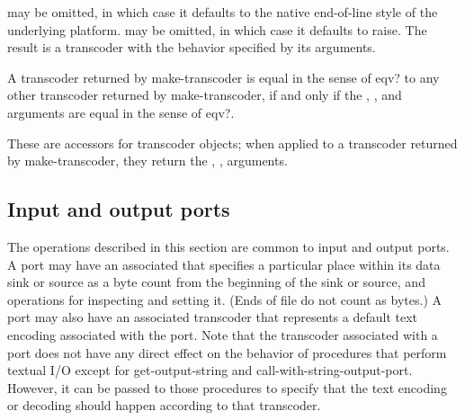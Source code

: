 \begin{entry}{%
}

   may be omitted, in
which case it defaults to the native end-of-line style of the
underlying platform.   may be omitted, in which
case it defaults to {\cf raise}.  The result is a transcoder with the
behavior specified by its arguments.

A transcoder returned by {\cf make-transcoder} is equal in the sense
of {\cf eqv?} to any other transcoder returned by {\cf
  make-transcoder}, if and only if the , ,
and  arguments are equal in the sense of {\cf
  eqv?}.
\end{entry}

\begin{entry}{%
}

These are accessors for transcoder objects; when applied to a
transcoder returned by {\cf make-transcoder}, they return the
, ,  arguments.
\end{entry}

\subsection{Input and output ports}

The operations described in this section are common to input and
output ports.  A port may have an associated  that
specifies a particular place within its data sink or source as a byte
count from the beginning of the sink or source, and operations for
inspecting and setting it.  (Ends of file do not count as bytes.)
A port may also have an associated
transcoder that represents a default text encoding associated with the
port.  Note that the transcoder associated with a port does not have
any direct effect on the behavior of procedures that perform
textual I/O except for {\cf get-output-string} and {\cf
  call-with-string-output-port}.
However,
it can be passed to those procedures to specify that the text encoding
or decoding should happen according to that transcoder.

